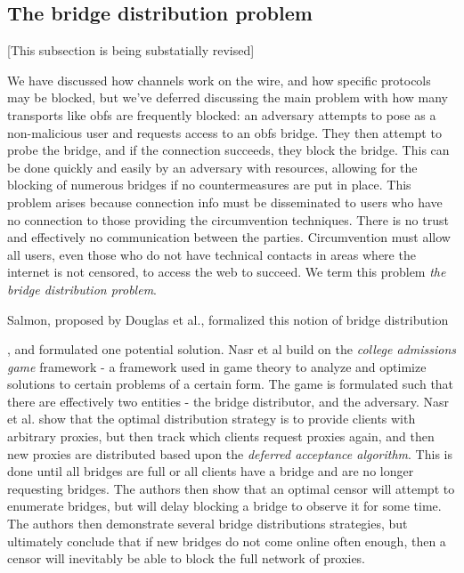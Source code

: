 \documentclass[12pt]{report}
\begin{document}
\subsection{The bridge distribution problem}
\label{distribution}

[This subsection is being substatially revised]

We have discussed how channels work on the wire, and how specific protocols may be blocked, but we've deferred discussing the main problem with how many transports like obfs are frequently blocked: an adversary attempts to pose as a non-malicious user and requests access to an obfs bridge. They then attempt to probe the bridge, and if the connection succeeds, they block the bridge. This can be done quickly and easily by an adversary with resources, allowing for the blocking of numerous bridges if no countermeasures are put in place. This problem arises because connection info must be disseminated to users who have no connection to those providing the circumvention techniques. There is no trust and effectively no communication between the parties. Circumvention must allow all users, even those who do not have technical contacts in areas where the internet is not censored, to access the web to succeed. We term this problem \emph{the bridge distribution problem}.

Salmon, proposed by Douglas et al., formalized this notion of bridge distribution

, and formulated one potential solution.\cite{distribution} Nasr et al build on the \emph{college admissions game} framework - a framework used in game theory to analyze and optimize solutions to certain problems of a certain form. The game is formulated such that there are effectively two entities - the bridge distributor, and the adversary. Nasr et al. show that the optimal distribution strategy is to provide clients with arbitrary proxies, but then track which clients request proxies again, and then new proxies are distributed based upon the \emph{deferred acceptance algorithm}. This is done until all bridges are full or all clients have a bridge and are no longer requesting bridges.\cite{distribution} The authors then show that an optimal censor will attempt to enumerate bridges, but will delay blocking a bridge to observe it for some time. The authors then demonstrate several bridge distributions strategies, but ultimately conclude that if new bridges do not come online often enough, then a censor will inevitably be able to block the full network of proxies.\cite{distribution}
\end{document}
